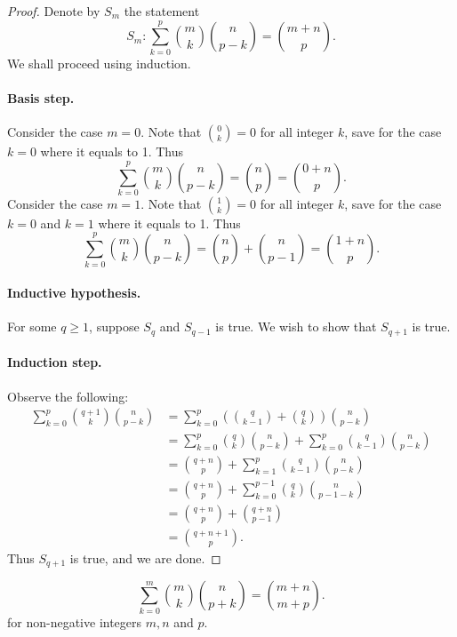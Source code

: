 \documentclass{exam}
\newcommand{\paren}[1]{\left(#1\right)}
\begin{document}
\begin{proof}
    Denote by $S_m$ the statement $$S_m:\sum_{k=0}^p\binom m k\binom{n}{p-k}=\binom{m+n}p.$$ We shall proceed using induction.

    \paragraph{Basis step.} Consider the case $m=0$. Note that $\binom 0 k = 0$ for all integer $k$, save for the case $k=0$ where it equals to 1. Thus $$\sum_{k=0}^p\binom m k\binom{n}{p-k} = \binom n p = \binom{0+n}p.$$ Consider the case $m=1$. Note that $\binom 1 k=0$ for all integer $k$, save for the case $k=0$ and $k=1$ where it equals to 1. Thus $$\sum_{k=0}^p\binom m k\binom{n}{p-k} = \binom n p + \binom{n}{p-1} = \binom{1+n}p.$$

    \paragraph{Inductive hypothesis.} For some $q\ge1$, suppose $S_q$ and $S_{q-1}$ is true. We wish to show that $S_{q+1}$ is true.

    \paragraph{Induction step.} Observe the following:
    \begin{align*}
        \sum_{k=0}^p\binom{q+1}k\binom{n}{p-k} &= \sum_{k=0}^p\paren{\binom{q}{k-1}+\binom q k}\binom{n}{p-k}\\
        &=\sum_{k=0}^p\binom q k\binom{n}{p-k} + \sum_{k=0}^p\binom{q}{k-1}\binom{n}{p-k}\\
        &=\binom{q+n}{p} + \sum_{k=1}^p\binom{q}{k-1}\binom{n}{p-k}\\
        &=\binom{q+n}{p} + \sum_{k=0}^{p-1}\binom q k\binom{n}{p-1-k}\\
        &=\binom{q+n}p + \binom{q+n}{p-1}\\
        &=\binom{q+n+1}{p}.
    \end{align*}
    Thus $S_{q+1}$ is true, and we are done.
\end{proof}

\begin{proposition}{10.39}
    $$\sum_{k=0}^m\binom m k\binom{n}{p+k} = \binom{m+n}{m+p}.$$ for non-negative integers $m,n$ and $p$.
\end{proposition}
\end{document}
